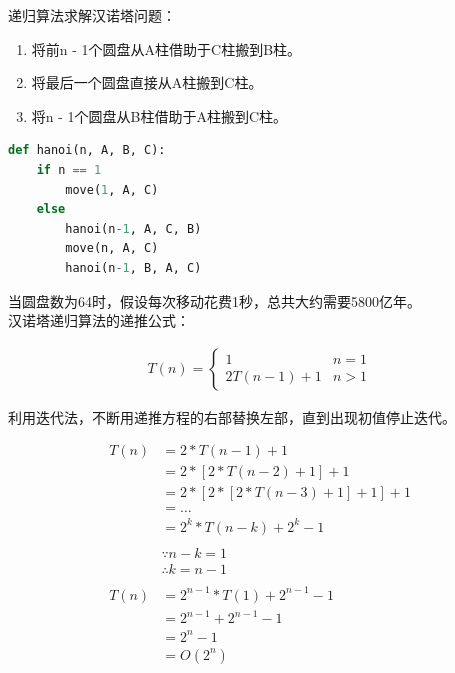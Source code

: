 递归算法求解汉诺塔问题：

\begin{enumerate}
    \item 将前n - 1个圆盘从A柱借助于C柱搬到B柱。
    \item 将最后一个圆盘直接从A柱搬到C柱。
    \item 将n - 1个圆盘从B柱借助于A柱搬到C柱。
\end{enumerate}

\vspace{0.5cm}


\begin{lstlisting}[language=Python]
def hanoi(n, A, B, C):
    if n == 1
        move(1, A, C)
    else
        hanoi(n-1, A, C, B)
        move(n, A, C)
        hanoi(n-1, B, A, C)
\end{lstlisting}

当圆盘数为64时，假设每次移动花费1秒，总共大约需要5800亿年。 \\

汉诺塔递归算法的递推公式：

\vspace{-0.5cm}

\begin{align*}
    T(n) = \begin{cases}
        1             & n = 1 \\
        2T(n - 1) + 1 & n > 1
    \end{cases}
\end{align*}

利用迭代法，不断用递推方程的右部替换左部，直到出现初值停止迭代。

\vspace{-0.5cm}

\begin{align*}
    T(n) & = 2 * T(n - 1) + 1                     \\
         & = 2 * [ 2 * T(n - 2) + 1] + 1          \\
         & = 2 * [2 * [2 * T(n - 3) + 1] + 1] + 1 \\
         & = \dots                                \\
         & = 2^k * T(n - k) + 2^k - 1             \\
    \\
         & \because n - k = 1                     \\
         & \therefore k = n - 1                   \\
    \\
    T(n) & = 2^{n-1} * T(1) + 2^{n-1} - 1         \\
         & = 2^{n-1} + 2^{n-1} - 1                \\
         & = 2^n - 1                              \\
         & = O(2^n)
\end{align*}

